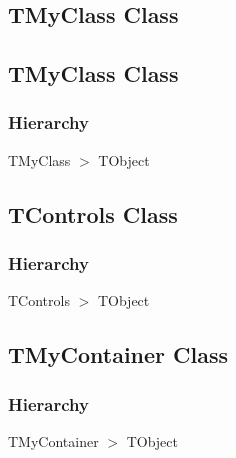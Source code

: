 \documentclass{report}
\newif\ifpdf
\begin{document}
\subsection*{\large{\textbf{TMyClass Class}}\normalsize\hspace{1ex}\hrulefill}
\else
\subsection*{TMyClass Class}
\fi
\label{ok_type_aliases.TMyClass}
\subsubsection*{\large{\textbf{Hierarchy}}\normalsize\hspace{1ex}\hfill}
TMyClass {$>$} TObject
\ifpdf
\subsection*{\large{\textbf{TControls Class}}\normalsize\hspace{1ex}\hrulefill}
\else
\subsection*{TControls Class}
\fi
\label{ok_type_aliases.TControls}
\subsubsection*{\large{\textbf{Hierarchy}}\normalsize\hspace{1ex}\hfill}
TControls {$>$} TObject
\ifpdf
\subsection*{\large{\textbf{TMyContainer Class}}\normalsize\hspace{1ex}\hrulefill}
\else
\subsection*{TMyContainer Class}
\fi
\label{ok_type_aliases.TMyContainer}
\subsubsection*{\large{\textbf{Hierarchy}}\normalsize\hspace{1ex}\hfill}
TMyContainer {$>$} TObject
\end{document}
